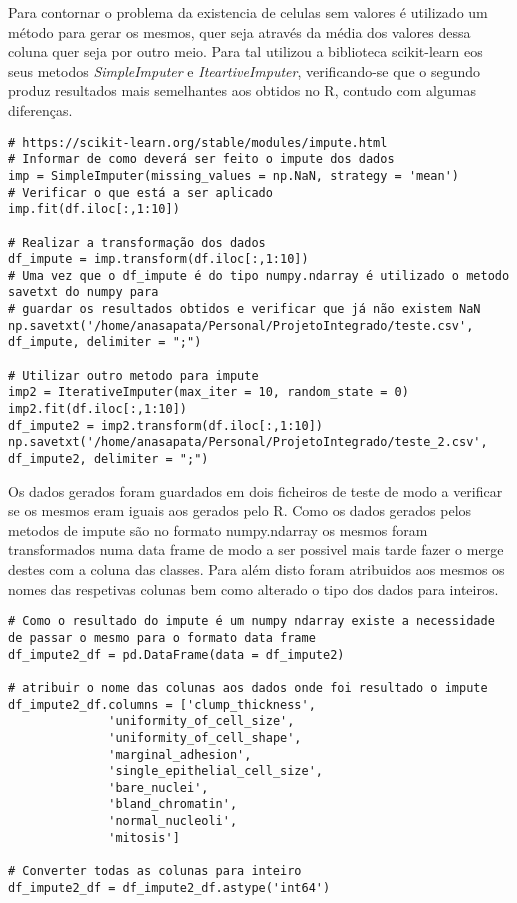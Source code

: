 \documentclass{article}
\begin{document}
Para contornar o problema da existencia de celulas sem valores \'e utilizado um m\'etodo para gerar os mesmos, quer seja atrav\'es da m\'edia dos valores dessa coluna quer seja por outro meio. Para tal utilizou a biblioteca scikit-learn eos seus metodos \textit{SimpleImputer} e \textit{IteartiveImputer}, verificando-se que o segundo produz resultados mais semelhantes aos obtidos no R, contudo com algumas diferenças.

\begin{lstlisting}
# https://scikit-learn.org/stable/modules/impute.html
# Informar de como deverá ser feito o impute dos dados
imp = SimpleImputer(missing_values = np.NaN, strategy = 'mean')
# Verificar o que está a ser aplicado
imp.fit(df.iloc[:,1:10])

# Realizar a transformação dos dados
df_impute = imp.transform(df.iloc[:,1:10])
# Uma vez que o df_impute é do tipo numpy.ndarray é utilizado o metodo savetxt do numpy para
# guardar os resultados obtidos e verificar que já não existem NaN
np.savetxt('/home/anasapata/Personal/ProjetoIntegrado/teste.csv', df_impute, delimiter = ";")

# Utilizar outro metodo para impute
imp2 = IterativeImputer(max_iter = 10, random_state = 0)
imp2.fit(df.iloc[:,1:10])
df_impute2 = imp2.transform(df.iloc[:,1:10])
np.savetxt('/home/anasapata/Personal/ProjetoIntegrado/teste_2.csv', df_impute2, delimiter = ";")
\end{lstlisting}

Os dados gerados foram guardados em dois ficheiros de teste de modo a verificar se os mesmos eram iguais aos gerados pelo R. 
Como os dados gerados pelos metodos de impute são no formato numpy.ndarray os mesmos foram transformados numa data frame de modo a ser possivel mais tarde fazer o merge destes com a coluna das classes. Para al\'em disto foram atribuidos aos mesmos os nomes das respetivas colunas bem como alterado o tipo dos dados para inteiros.

\begin{lstlisting}
# Como o resultado do impute é um numpy ndarray existe a necessidade de passar o mesmo para o formato data frame
df_impute2_df = pd.DataFrame(data = df_impute2)

# atribuir o nome das colunas aos dados onde foi resultado o impute
df_impute2_df.columns = ['clump_thickness',
              'uniformity_of_cell_size',
              'uniformity_of_cell_shape',
              'marginal_adhesion',
              'single_epithelial_cell_size',
              'bare_nuclei',
              'bland_chromatin',
              'normal_nucleoli',
              'mitosis']

# Converter todas as colunas para inteiro
df_impute2_df = df_impute2_df.astype('int64')
\end{lstlisting}
\end{document}
